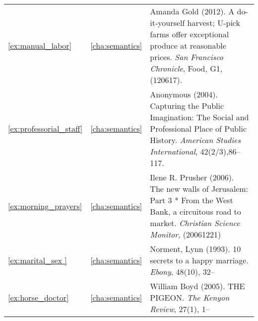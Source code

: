 \begin{longtable}{lcp{8.5cm}}
\ref{ex:manual_labor}&\ref{cha:semantics}&Amanda Gold (2012). A do-it-yourself harvest; U-pick farms offer exceptional produce at reasonable prices. \emph{San Francisco Chronicle}, Food, G1, (120617).\\
\ref{ex:professorial_staff}&\ref{cha:semantics}&Anonymous (2004). Capturing the Public Imagination: The Social and Professional Place of Public History. \emph{American Studies International}, 42(2/3),86--117.\\
\ref{ex:morning_prayers}&\ref{cha:semantics}&Ilene R. Prusher (2006). The new walls of Jerusalem: Part 3 * From the West Bank, a circuitous road to market. \emph{Christian Science Monitor}, (20061221)\\
\ref{ex:marital_sex }&\ref{cha:semantics}&Norment, Lynn (1993). 10 secrets to a happy marriage. \emph{Ebony}, 48(10), 32--\\
\ref{ex:horse_doctor}&\ref{cha:semantics}&William Boyd (2005). THE PIGEON. \emph{The Kenyon Review}, 27(1), 1-- \\

\end{longtable}
